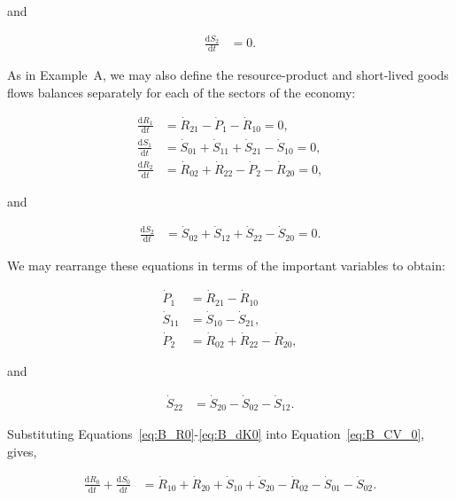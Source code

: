 \noindent{}and

\begin{align}
	\frac{\mathrm{d}S_{2}}{\mathrm{d}t} 			&
	= 0.
\end{align}

As in Example~A,
we may also define the resource-product
and short-lived goods flows balances separately
for each of the sectors of the economy:

\begin{align}
	\frac{\mathrm{d}R_{1}}{\mathrm{d}t} 	&
	= \dot{R}_{21}
	- \dot{P}_{1}
	- \dot{R}_{10}
	= 0,															\\
\label{eq:B_dS1}
	\frac{\mathrm{d}S_{1}}{\mathrm{d}t} 	&
	= \dot{S}_{01}
	+ \dot{S}_{11}
	+ \dot{S}_{21}
	- \dot{S}_{10}
	= 0,															\\
	\frac{\mathrm{d}R_{2}}{\mathrm{d}t} 	&
	= \dot{R}_{02}
	+ \dot{R}_{22}
	- \dot{P}_{2}
	- \dot{R}_{20}
	= 0,
\end{align}

\noindent{}and

\begin{align}
\label{eq:B_dS2}
	\frac{\mathrm{d}S_{2}}{\mathrm{d}t} 	&
	= \dot{S}_{02}
	+ \dot{S}_{12}
	+ \dot{S}_{22}
	- \dot{S}_{20}
	= 0.
\end{align}

We may rearrange these equations in terms of
the important variables to obtain:

\begin{align}
\label{eq:B_P1a}
	\dot{P}_{1}												&
	= \dot{R}_{21}
	- \dot{R}_{10}											\\
\label{eq:B_S11}
	\dot{S}_{11}											&
	= \dot{S}_{10}
	- \dot{S}_{21},										\\
\label{eq:B_P2a}
	\dot{P}_{2}												&
	= \dot{R}_{02}
	+ \dot{R}_{22}
	- \dot{R}_{20},
\end{align}

\noindent{}and

\begin{align}
\label{eq:B_S22}
	\dot{S}_{22}											&
	= \dot{S}_{20}
	- \dot{S}_{02} 
	- \dot{S}_{12}.	
\end{align}


Substituting
Equations~\ref{eq:B_R0}-\ref{eq:B_dK0}
into Equation~\ref{eq:B_CV_0}, 
gives,

\begin{align} \label{eq:B_CV_0a}
	\frac{\mathrm{d}R_{0}}{\mathrm{d}t} 
	+ \frac{\mathrm{d}S_{0}}{\mathrm{d}t}		& 
	= \dot{R}_{10} + \dot{R}_{20} 
	+ \dot{S}_{10} + \dot{S}_{20} 
	- \dot{R}_{02} 
	- \dot{S}_{01}
	- \dot{S}_{02}.
\end{align}

